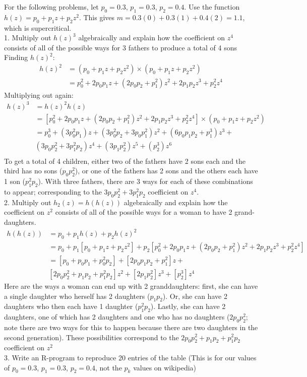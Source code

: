 \documentclass[]{book}
\begin{document}
For the following problems, let \(p_0 = 0.3\), \(p_1=0.3\), \(p_2=0.4\). Use the function \(h(z) = p_0 + p_1 z + p_2 z^2\). This gives \(m= 0.3(0) + 0.3(1) + 0.4(2) = 1.1\), which is supercritical.\\
1. Multiply out \(h(z)^3\) algebraically and explain how the coefficient on \(z^4\) consists of all of the possible ways for 3 fathers to produce a total of 4 sons
Finding \(h(z)^2\):
\[\begin{aligned} 
    h(z)^2 &= (p_0 + p_1 z + p_2 z^2)\times(p_0 + p_1 z + p_2 z^2) \\
    &= p_0^2+2p_0p_1z+(2p_0p_2+p_1^2)z^2 + 2p_1p_2z^3 + p_2^2z^4
    \end{aligned}\]
Multiplying out again:
\[\begin{aligned}
    h(z)^3 &= h(z)^2 h(z) \\
    &= [p_0^2+2p_0p_1z+(2p_0p_2+p_1^2)z^2 + 2p_1p_2z^3 + p_2^2z^4]\times(p_0 + p_1 z + p_2 z^2) \\
    &= p_0^3 + (3p_0^2p_1)z + (3p_0^2p_2 + 3p_0p_1^2)z^2 +(6p_0p_1p_2+p_1^3)z^3 + \\
    & (3p_0p_2^2+3p_1^2p_2)z^4+ (3p_1p_2^2)z^5 + (p_2^3)z^6\\
    \end{aligned}\]
To get a total of 4 children, either two of the fathers have 2 sons each and the third has no sons (\(p_0p_2^2\)), or one of the fathers has 2 sons and the others each have 1 son (\(p_1^2p_2\)). With three fathers, there are 3 ways for each of these combinations to appear; corresponding to the \(3p_0p_2^2+3p_1^2p_2\) coefficient on \(z^4\).\\
2. Multiply out \(h_2(z) = h(h(z))\) algebraically and explain how the coefficient on \(z^2\) consists of all of the possible ways for a woman to have 2 grand-daughters.
\[\begin{aligned}
    h(h(z)) & = p_0+p_1h(z)+p_2h(z)^2 \\
    & = p_0 +p_1[p_0 + p_1 z + p_2 z^2] + p_2[p_0^2+2p_0p_1z+(2p_0p_2+p_1^2)z^2 + 2p_1p_2z^3 + p_2^2z^4] \\
    &= [p_0+p_0p_1+p_0^2p_2] + [2p_0p_1p_2+p_1^2]z +\\
    & [2p_0p_2^2+p_1p_2+p_1^2p_2]z^2 + [2p_1p_2^2]z^3+[p_2^3]z^4
    \end{aligned}\]
Here are the ways a woman can end up with 2 granddaughters: first, she can have a single daughter who herself has 2 daughters (\(p_1p_2\)). Or, she can have 2 daughters who then each have 1 daughter (\(p_1^2 p_2\)). Lastly, she can have 2 daughters, one of which has 2 daughters and one who has no daughters (\(2p_0 p_2^2\); note there are two ways for this to happen because there are two daughters in the second generation). These possibilities correspond to the \(2p_0p_2^2+p_1p_2+p_1^2p_2\) coefficient on \(z^2\)\\
3. Write an R-program to reproduce 20 entries of the table (This is for our values of \(p_0 = 0.3\), \(p_1=0.3\), \(p_2=0.4\), not the \(p_k\) values on wikipedia)
\end{document}
